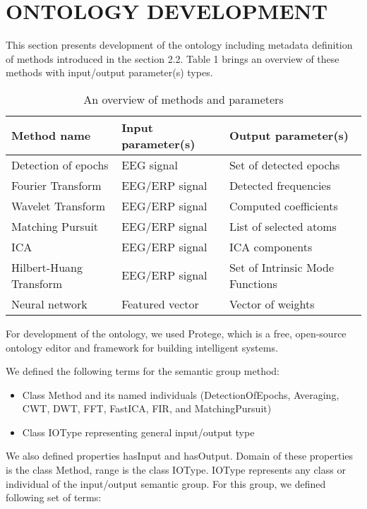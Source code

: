 \documentclass[a4paper,twoside]{article}
\begin{document}
\section{\uppercase{Ontology Development}}

\noindent This section presents development of the ontology including metadata definition of methods introduced in the section 2.2. Table 1 brings an overview of these methods with input/output parameter(s) types.


\begin{table}[h]
\caption{An overview of methods and parameters}\label{tab:example1} \centering
\begin{tabular}{|p{2cm}|p{2cm}|p{2cm}|}
  \hline
  Method name & Input parameter(s) & Output parameter(s) \\
  \hline
  Detection of epochs & EEG signal &  Set of detected epochs \\
  \hline
  Fourier Transform & EEG/ERP signal &  Detected frequencies \\
  \hline
  Wavelet Transform & EEG/ERP signal &  Computed coefficients \\
  \hline
  Matching Pursuit & EEG/ERP signal &  List of selected atoms \\
  \hline
  ICA & EEG/ERP signal &  ICA components \\
  \hline
  Hilbert-Huang Transform & EEG/ERP signal & Set of Intrinsic Mode Functions \\
  \hline
  Neural network & Featured vector & Vector of weights \\
  \hline
\end{tabular}
\end{table}


For development of the ontology, we used Protege, which is a free, open-source ontology editor and framework for building intelligent systems.

We defined the following terms for the semantic group method:
\begin{itemize}
\item Class Method and its named individuals (DetectionOfEpochs, Averaging, CWT, DWT, FFT, FastICA, FIR, and MatchingPursuit)
\item Class IOType representing general input/output type
\end{itemize}

We also defined properties hasInput and hasOutput. Domain of these properties is the class Method, range is the class IOType. IOType represents any class or individual of the input/output semantic group. For this group, we defined following set of terms:
\end{document}
